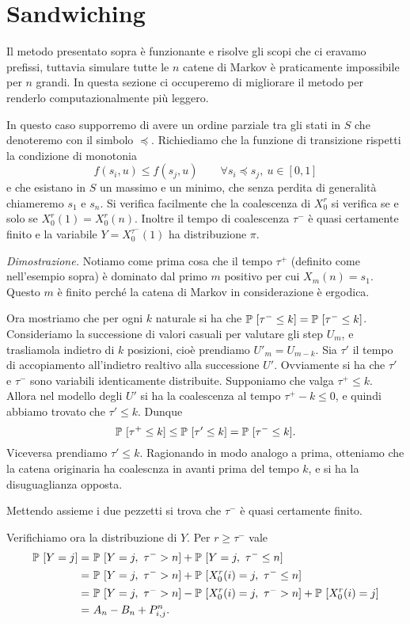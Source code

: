 \documentclass[]{marticle}
\begin{document}
\section{Sandwiching}

Il metodo presentato sopra \`e funzionante e risolve gli scopi che ci eravamo
prefissi, tuttavia simulare tutte le $n$ catene di Markov \`e praticamente
impossibile per $n$ grandi. In questa sezione ci occuperemo di migliorare il
metodo per renderlo computazionalmente pi\`u leggero.
 
In questo caso supporremo di avere un ordine parziale tra gli stati in $S$ che
denoteremo con il simbolo $\preceq$. Richiediamo che la funzione di transizione
rispetti la condizione di monotonia
\[
    f(s_i, u) \leq f(s_j, u) \qquad \forall s_i \preceq s_j,\ u \in [0,1]
\]
e che esistano in $S$ un massimo e un minimo, che senza perdita di generalit\`a
chiameremo $s_1$ e $s_n$. Si verifica facilmente che la coalescenza di $X^r_0$
si verifica se e solo se $X^r_0(1) = X^r_0(n)$. Inoltre il tempo di coalescenza
$\tau^-$ \`e quasi certamente finito e la variabile $Y=X^{\tau^-}_0(1)$ ha
distribuzione $\pi$.

\textit{Dimostrazione.} Notiamo come prima cosa che il tempo $\tau^+$ (definito
come nell'esempio sopra) \`e dominato dal primo $m$ positivo per cui $X_m(n) =
s_1$. Questo $m$ \`e finito perch\'e la catena di Markov in considerazione \`e
ergodica. 

Ora mostriamo che per ogni $k$ naturale si ha che $\mathbb{P}\ [\tau^- \leq k] =
\mathbb{P}\ [\tau^- \leq k]$. Consideriamo la successione di valori casuali per
valutare gli step $U_m$, e trasliamola indietro di $k$ posizioni, cio\`e
prendiamo $U'_m = U_{m-k}$. Sia $\tau'$ il tempo di accopiamento all'indietro
realtivo alla successione $U'$. Ovviamente si ha che $\tau'$ e $\tau^-$ sono
variabili identicamente distribuite. Supponiamo che valga $\tau^+ \leq k$.
Allora nel modello degli $U'$ si ha la coalescenza al tempo $\tau^+ - k  \leq
0$, e quindi abbiamo trovato che $\tau' \leq k$. Dunque
\[
    \mathbb{P}\ [ \tau^+ \leq k] \leq \mathbb{P}\ [ \tau' \leq k] = \mathbb{P}\ [ \tau^- \leq k].
\]
Viceversa prendiamo $\tau' \leq k$. Ragionando in modo analogo a prima,
otteniamo che la catena originaria ha coalescnza in avanti prima del tempo $k$,
e si ha la disuguaglianza opposta.

Mettendo assieme i due pezzetti si trova che $\tau^-$ \`e quasi certamente
finito. 

Verifichiamo ora la distribuzione di $Y$. Per $r \geq \tau^-$ vale
\begin{align*}
    \mathbb{P}\ [Y=j] =&\ \mathbb{P}\ [Y=j,\ \tau^- > n] + \mathbb{P}\ [Y=j,\ \tau^- \leq n] \\
    =&\ \mathbb{P}\ [Y=j,\ \tau^- > n] + \mathbb{P}\ [X_0^r(i)=j,\ \tau^- \leq n] \\
    =&\ \mathbb{P}\ [Y=j,\ \tau^- > n] - \mathbb{P}\ [X_0^r(i)=j,\ \tau^- > n] 
            + \mathbb{P}\ [X_0^r(i)=j] \\
    =&\ A_n - B_n + P^n_{i,j}.
\end{align*}
\end{document}
